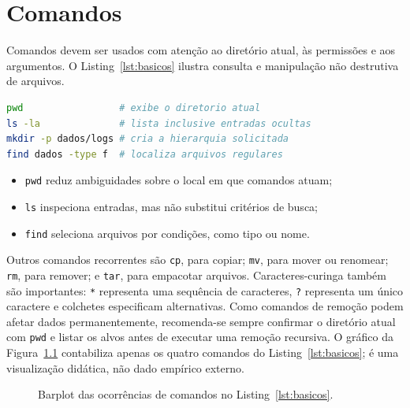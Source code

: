 \documentclass[12pt,openright,oneside,a4paper,brazil]{abntex2}
\begin{document}
\chapter{Comandos}\label{sec:comandos}
Comandos devem ser usados com atenção ao diretório atual, às permissões e aos argumentos. O Listing~\ref{lst:basicos} ilustra consulta e manipulação não destrutiva de arquivos.
\begin{lstlisting}[language=bash,caption={Exemplos básicos de navegação e inspeção.},label={lst:basicos}]
pwd                 # exibe o diretorio atual
ls -la              # lista inclusive entradas ocultas
mkdir -p dados/logs # cria a hierarquia solicitada
find dados -type f  # localiza arquivos regulares
\end{lstlisting}
\begin{itemize}
  \item \texttt{pwd} reduz ambiguidades sobre o local em que comandos atuam;
  \item \texttt{ls} inspeciona entradas, mas não substitui critérios de busca;
  \item \texttt{find} seleciona arquivos por condições, como tipo ou nome.
\end{itemize}
Outros comandos recorrentes são \texttt{cp}, para copiar; \texttt{mv}, para mover ou renomear; \texttt{rm}, para remover; e \texttt{tar}, para empacotar arquivos. Caracteres-curinga também são importantes: \texttt{*} representa uma sequência de caracteres, \texttt{?} representa um único caractere e colchetes especificam alternativas. Como comandos de remoção podem afetar dados permanentemente, recomenda-se sempre confirmar o diretório atual com \texttt{pwd} e listar os alvos antes de executar uma remoção recursiva.
O gráfico da Figura~\ref{fig:barplot} contabiliza apenas os quatro comandos do Listing~\ref{lst:basicos}; é uma visualização didática, não dado empírico externo.
\begin{figure}[htbp]\centering
{}
\caption{Barplot das ocorrências de comandos no Listing~\ref{lst:basicos}.}\label{fig:barplot}
\end{figure}
\end{document}
